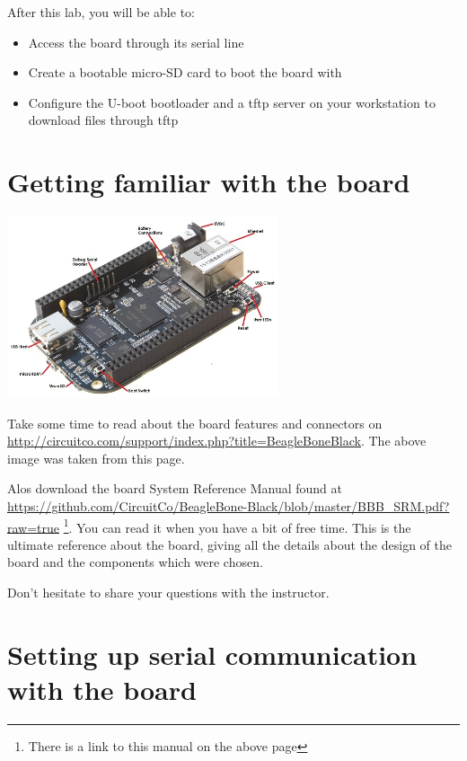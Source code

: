 
After this lab, you will be able to:
\begin{itemize}
\item Access the board through its serial line
\item Create a bootable micro-SD card to boot the 
      board with
\item Configure the U-boot bootloader and a tftp server
      on your workstation to download files through tftp
\end{itemize}

\section{Getting familiar with the board}

\begin{center}
\includegraphics[width=8cm]{labs/kernel-board-setup/beaglebone-black-connectors.jpg}
\end{center}

Take some time to read about the board features and connectors on
\url{http://circuitco.com/support/index.php?title=BeagleBoneBlack}. The
above image was taken from this page.

Alos download the board System Reference Manual found at 
\url{https://github.com/CircuitCo/BeagleBone-Black/blob/master/BBB_SRM.pdf?raw=true}
\footnote{There is a link to this manual on the above page}.
You can read it when you have a bit of free time. This is the ultimate
reference about the board, giving all the details about the design of
the board and the components which were chosen. 

Don't hesitate to share your questions with the instructor.

\section{Setting up serial communication with the board}

